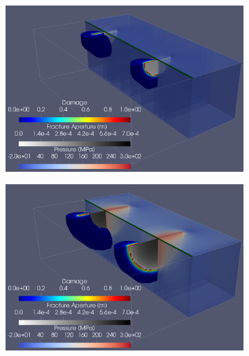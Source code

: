 \begin{figure}[h]
\begin{subfigure}{.45\textwidth}
  \centering
  \includegraphics[width=\linewidth]{Chapter4/figures/3D/t_0.png}
  \caption{}
  \label{fig:parallel_t_0}
\end{subfigure}%
\hspace{1cm}
\begin{subfigure}{.45\textwidth}
  \centering
  \includegraphics[width=\linewidth]{Chapter4/figures/3D/t_30.png}
  \caption{}
  \label{fig:parallel_t_1}
\end{subfigure}%


\end{figure}

